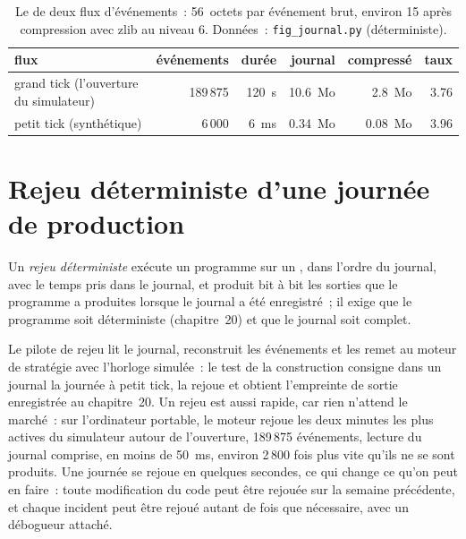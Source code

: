 \begin{table}[ht]
\centering\small
\begin{tabular}{lrrrrr}
\toprule
flux & événements & durée & journal & compressé & taux \\
\midrule
grand tick (l'ouverture du simulateur) & 189\,875 & \qty{120}{\second} & 10.6~Mo & 2.8~Mo & 3.76 \\
petit tick (synthétique) & 6\,000 & \qty{6}{\milli\second} & 0.34~Mo & 0.08~Mo & 3.96 \\
\bottomrule
\end{tabular}
\caption{Le  de deux flux d'événements~: 56~octets par événement brut, environ 15 après compression avec zlib au niveau 6. Données~:
\texttt{fig\_journal.py} (déterministe).}\label{tab:ll:logging-capture-and-replay:journal}
\end{table}

\section{Rejeu déterministe d'une journée de production}

\begin{definition}\label{def:ll:logging-capture-and-replay:replay}
Un \emph{rejeu déterministe} exécute un programme sur un , dans l'ordre du journal, avec le temps
pris dans le journal, et produit bit à bit les sorties que le programme a produites lorsque le journal a été enregistré~; il
exige que le programme soit déterministe (chapitre~20) et que le journal soit complet.
\end{definition}

Le pilote de rejeu lit le journal, reconstruit les événements et les remet au moteur de stratégie avec l'horloge simulée~: le test de la
construction consigne dans un journal la journée à petit tick, la rejoue et obtient l'empreinte de sortie enregistrée au chapitre~20. Un rejeu est aussi
rapide, car rien n'attend le marché~: sur l'ordinateur portable, le moteur rejoue les deux minutes les plus actives du simulateur autour de l'ouverture,
189\,875 événements, lecture du journal comprise, en moins de \qty{50}{\milli\second}, environ 2\,800 fois plus vite qu'ils ne se sont produits. Une journée
se rejoue en quelques secondes, ce qui change ce qu'on peut en faire~: toute modification du code peut être rejouée sur la semaine précédente, et
chaque incident peut être rejoué autant de fois que nécessaire, avec un débogueur attaché.

